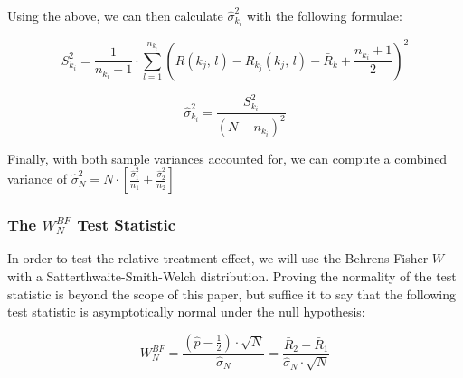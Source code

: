 \documentclass[pdflatex,sn-mathphys-num]{sn-jnl}
\theoremstyle{thmstyleone}
\theoremstyle{thmstyletwo}
\theoremstyle{thmstylethree}
\begin{document}
            \vspace{10pt}

            \noindent Using the above, we can then calculate $\hat{\sigma}_{k_{i}}^{2}$ with the following formulae:

            \vspace{10pt}

            \begin{equation}
                S_{k_{i}}^{2} = \frac{1}{n_{k_{i}} - 1} \cdot \sum_{l=1}^{n_{k_{i}}} \left( R(k_{j}, \, l) - R_{k_{j}}(k_{j}, \, l) - \bar{R}_{k} + \frac{n_{k_{i}} + 1}{2} \right)^{2}
            \end{equation}

            \vspace{10pt}

            \begin{equation}
                \hat{\sigma}_{k_{i}}^{2} = \frac{S_{k_{i}}^{2}}{(N - n_{k_{i}})^{2}}
            \end{equation}

            \vspace{10pt}

            \noindent Finally, with both sample variances accounted for, we can compute a combined variance of $\hat{\sigma}_{N}^{2} = N \cdot \left[ \frac{\hat{\sigma}_{1}^{2}}{n_{1}} + \frac{\hat{\sigma}_{2}^{2}}{n_{2}}\right]$

            \vspace{10pt}

            \subsubsection{The \texorpdfstring{$W_{N}^{BF}$}{Wₙᷨ ᷫ } Test Statistic}

            In order to test the relative treatment effect, we will use the Behrens-Fisher $W$ with a Satterthwaite-Smith-Welch distribution. Proving the normality of the test statistic is beyond the scope of this paper, but suffice it to say that the following test statistic is asymptotically normal under the null hypothesis:

            \vspace{10pt}

            \begin{equation}
                W_{N}^{BF} = \frac{\left(\hat{p} - \frac{1}{2} \right) \cdot \sqrt{N}}{\hat{\sigma}_{N}} = \frac{\bar{R}_{2} - \bar{R}_{1}}{\hat{\sigma}_{N} \cdot \sqrt{N}}
            \end{equation}
\end{document}
